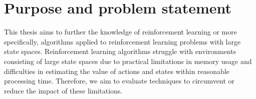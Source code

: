 \section{Purpose and problem statement}

This thesis aims to further the knowledge of reinforcement learning or more specifically, algorithms applied to reinforcement learning problems with large state spaces. Reinforcement learning algorithms struggle with environments consisting of large state spaces due to practical limitations in memory usage and difficulties in estimating the value of actions and states within reasonable processing time. Therefore, we aim to evaluate techniques to circumvent or reduce the impact of these limitations.

